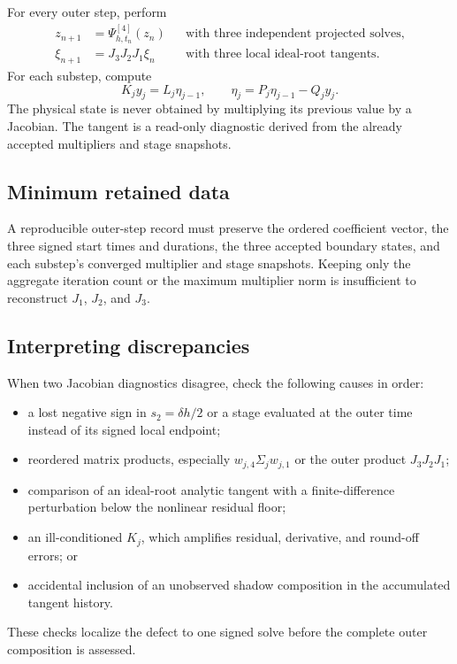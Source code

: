 \documentclass[11pt,a4paper]{article}
\begin{document}
For every outer step, perform
\[
 \boxed{
 \begin{aligned}
 z_{n+1}&=\Psi^{[4]}_{h,t_n}(z_n)
 &&\text{with three independent projected solves},\\[1mm]
 \xi_{n+1}&=J_3J_2J_1\xi_n
 &&\text{with three local ideal-root tangents}.
 \end{aligned}
 }
\]
For each substep, compute
\[
 K_jy_j=L_j\eta_{j-1},
 \qquad
 \eta_j=P_j\eta_{j-1}-Q_jy_j.
\]
The physical state is never obtained by multiplying its previous value by a
Jacobian.  The tangent is a read-only diagnostic derived from the already
accepted multipliers and stage snapshots.

\subsection*{Minimum retained data}

A reproducible outer-step record must preserve the ordered coefficient vector,
the three signed start times and durations, the three accepted boundary states,
and each substep's converged multiplier and stage snapshots.  Keeping only the
aggregate iteration count or the maximum multiplier norm is insufficient to
reconstruct $J_1$, $J_2$, and $J_3$.

\subsection*{Interpreting discrepancies}

When two Jacobian diagnostics disagree, check the following causes in order:
\begin{itemize}
 \item a lost negative sign in $s_2=\delta h/2$ or a stage evaluated at the
       outer time instead of its signed local endpoint;
 \item reordered matrix products, especially $w_{j,4}\Sigma_jw_{j,1}$ or the
       outer product $J_3J_2J_1$;
 \item comparison of an ideal-root analytic tangent with a finite-difference
       perturbation below the nonlinear residual floor;
 \item an ill-conditioned $K_j$, which amplifies residual, derivative, and
       round-off errors; or
 \item accidental inclusion of an unobserved shadow composition in the
       accumulated tangent history.
\end{itemize}

These checks localize the defect to one signed solve before the complete outer
composition is assessed.
\end{document}
